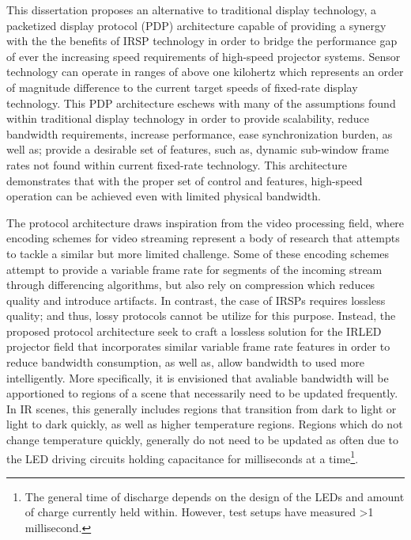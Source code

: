 This dissertation proposes an alternative to traditional display technology, a packetized display protocol (PDP) architecture capable of providing a synergy with the the benefits of IRSP technology in order to bridge the performance gap of ever the increasing speed requirements of high-speed projector systems. Sensor technology can operate in ranges of above one kilohertz which represents an order of magnitude difference to the current target speeds of fixed-rate display technology. This PDP architecture eschews with many of the assumptions found within traditional display technology in order to provide scalability, reduce bandwidth requirements, increase performance, ease synchronization burden, as well as; provide a desirable set of features, such as, dynamic sub-window frame rates not found within current fixed-rate technology. This architecture demonstrates that with the proper set of control and features, high-speed operation can be achieved even with limited physical bandwidth.

 The protocol architecture draws inspiration from the video processing field, where encoding schemes for video streaming represent a body of research that attempts to tackle a similar but more limited challenge\cite{BakarEtAl2017}. Some of these encoding schemes attempt to provide a variable frame rate for segments of the incoming stream through differencing algorithms, but also rely on compression\cite{CastilloEtAl2012} which reduces quality and introduce artifacts. In contrast, the case of IRSPs requires lossless quality; and thus, lossy protocols cannot be utilize for this purpose. Instead, the proposed protocol architecture seek to craft a lossless solution for the IRLED projector field that incorporates similar variable frame rate features in order to reduce bandwidth consumption, as well as, allow bandwidth to used more intelligently. More specifically, it is envisioned that avaliable bandwidth will be apportioned to regions of a scene that necessarily need to be updated frequently. In IR scenes, this generally includes regions that transition from dark to light or light to dark quickly, as well as higher temperature regions. Regions which do not change temperature quickly, generally do not need to be updated as often due to the LED driving circuits holding capacitance for milliseconds at a time\footnote{The general time of discharge depends on the design of the LEDs and amount of charge currently held within. However, test setups have measured \textgreater1 millisecond.}.

